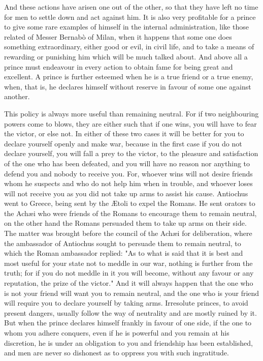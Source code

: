 \documentclass[12pt,letterpaper]{memoir}
\begin{document}
And these actions have arisen one out of the other, so that they have
left no time for men to settle down and act against him. It is also
very profitable for a prince to give some rare examples of himself in
the internal administration, like those related of Messer Bernabò of
Milan, when it happens that some one does something extraordinary,
either good or evil, in civil life, and to take a means of rewarding
or punishing him which will be much talked about. And above all a
prince must endeavour in every action to obtain fame for being great
and excellent. A prince is further esteemed when he is a true friend
or a true enemy, when, that is, he declares himself without reserve in
favour of some one against another.

This policy is always more useful than remaining neutral. For if two
neighbouring powers come to blows, they are either such that if one
wins, you will have to fear the victor, or else not. In either of these
two cases it will be better for you to declare yourself openly and make
war, because in the first case if you do not declare yourself, you will
fall a prey to the victor, to the pleasure and satisfaction of the one
who has been defeated, and you will have no reason nor anything to
defend you and nobody to receive you. For, whoever wins will not desire
friends whom he suspects and who do not help him when in trouble, and
whoever loses will not receive you as you did not take up arms to
assist his cause. Antiochus went to Greece, being sent by the Ætoli
to expel the Romans. He sent orators to the Achæi who were friends of
the Romans to encourage them to remain neutral, on the other hand the
Romans persuaded them to take up arms on their side. The matter was
brought before the council of the Achæi for deliberation, where the
ambassador of Antiochus sought to persuade them to remain neutral, to
which the Roman ambassador replied: "As to what is said that it is best
and most useful for your state not to meddle in our war, nothing is
further from the truth; for if you do not meddle in it you will become,
without any favour or any reputation, the prize of the victor." And it
will always happen that the one who is not your friend will want you
to remain neutral, and the one who is your friend will require you to
declare yourself by taking arms. Irresolute princes, to avoid present
dangers, usually follow the way of neutrality and are mostly ruined
by it. But when the prince declares himself frankly in favour of one
side, if the one to whom you adhere conquers, even if he is powerful
and you remain at his discretion, he is under an obligation to you and
friendship has been established, and men are never so dishonest as to
oppress you with such ingratitude.
\end{document}
